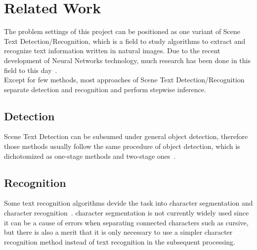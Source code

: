 \section{Related Work}

The problem settings of this project can be positioned as one variant of Scene Text Detection/Recognition, which
is a field to study algorithms to extract and recognize text information written in natural images.
Due to the recent development of Neural Networks technology,
much research has been done in this field to this day~\cite{long2018scene}.\\
Except for few methods\cite{liu2018fots}\cite{lyu2018mask}, most approaches of Scene Text Detection/Recognition
separate detection and recognition and perform stepwise inference.

\subsection{Detection}

Scene Text Detection can be subsumed under general object detection, therefore those methods usually follow
the same procedure of object detection, which is dichotomized as one-stage methods and two-stage ones~\cite{liu2018deep}.\\

\subsection{Recognition}

Some text recognition algorithms devide the task into character segmentation and character recognition~\cite{bissacco2013photoocr}\cite{phan2011gradient}.
character segmentation is not currently widely used
since it can be a cause of errors when separating connected characters such as cursive,
but there is also a merit that it is only necessary to use a simpler character recognition method
instead of text recognition in the subsequent processing.
